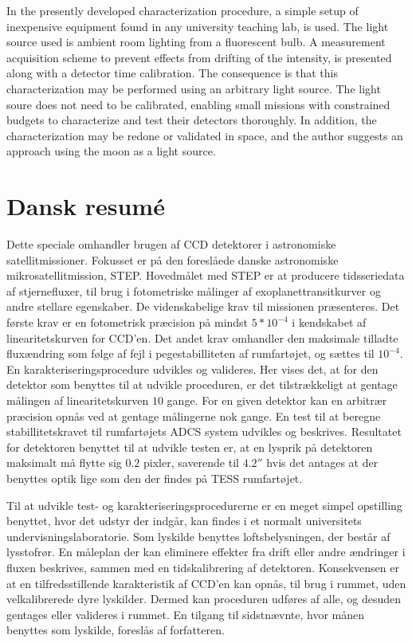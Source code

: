 \documentclass[../main.tex]{subfiles}
\begin{document}
	In the presently developed characterization procedure, a simple setup of inexpensive equipment found in any university teaching lab, is used. The light source used is ambient room lighting from a fluorescent bulb. A measurement acquisition scheme to prevent effects from drifting of the intensity, is presented along with a detector time calibration. The consequence is that this characterization may be performed using an arbitrary light source. The light soure does not need to be calibrated, enabling small missions with constrained budgets to characterize and test their detectors thoroughly. In addition, the characterization may be redone or validated in space, and the author suggests an approach using the moon as a light source. 
	\clearpage
	\thispagestyle{empty}
	\mbox{}
	\newpage
	\thispagestyle{empty}
	\chapter*{Dansk resumé}
	Dette speciale omhandler brugen af CCD detektorer i astronomiske satellitmissioner. Fokusset er på den foreslåede danske astronomiske mikrosatellitmission, STEP. Hovedmålet med STEP er at producere tidsseriedata af stjernefluxer, til brug i fotometriske målinger af exoplanettransitkurver og andre stellare egenskaber. De videnskabelige krav til missionen præsenteres. Det første krav er en fotometrisk præcision på mindst $5*10^{-4}$ i kendskabet af linearitetskurven for CCD'en. Det andet krav omhandler den maksimale tilladte fluxændring som følge af fejl i pegestabilliteten af rumfartøjet, og sættes til $10^{-4}$. En karakteriseringsprocedure udvikles og valideres. Her vises det, at for den detektor som benyttes til at udvikle proceduren, er det tilstrækkeligt at gentage målingen af linearitetskurven $10$ gange. For en given detektor kan en arbitrær præcision opnås ved at gentage målingerne nok gange. En test til at beregne stabillitetskravet til rumfartøjets ADCS system udvikles og beskrives. Resultatet for detektoren benyttet til at udvikle testen er, at en lysprik på detektoren maksimalt må flytte sig $ 0.2 $ pixler, saverende til $4.2 ''$ hvis det antages at der benyttes optik lige som den der findes på TESS rumfartøjet.
	
	Til at udvikle test- og karakteriseringsprocedurerne er en meget simpel opstilling benyttet, hvor det udstyr der indgår, kan findes i et normalt universitets undervisningslaboratorie. Som lyskilde benyttes loftsbelysningen, der består af lysstofrør. En måleplan der kan eliminere effekter fra drift eller andre ændringer i fluxen beskrives, sammen med en tidskalibrering af detektoren. Konsekvensen er at en tilfredsstillende karakteristik af CCD'en kan opnås, til brug i rummet, uden velkalibrerede dyre lyskilder. Dermed kan proceduren udføres af alle, og desuden gentages eller valideres i rummet. En tilgang til sidstnævnte, hvor månen benyttes som lyskilde, foreslås af forfatteren.
	\clearpage
	\thispagestyle{empty}
	\mbox{}
	\newpage
	\thispagestyle{empty}
\end{document}
